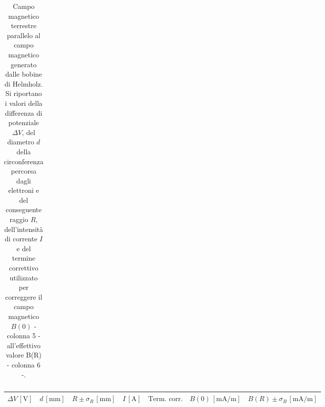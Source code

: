 \documentclass[]{article}
\begin{document}
\begin{table}
\begin{tabular}{||c|c|c|c|c|c|c||}
\end{tabular}
    \caption{Campo magnetico terrestre parallelo al campo magnetico generato dalle bobine di Helmholz. Si riportano i valori della differenza di potenziale $\Delta V$, del diametro $ d $ della circonferenza percorsa dagli elettroni e del conseguente raggio $ R $, dell'intensità di corrente $ I $ e del termine correttivo utilizzato per correggere il campo magnetico $B(0)$ - colonna 5 - all'effettivo valore B(R) - colonna 6 -.}
    \label{CM_parallelo}
\end{table}


\begin{table}
    \centering

\begin{tabular}{||c|c|c|c|c|c|c||}
    \hline
    $\Delta V\, [\text{V}] $ & $d\, [\text{mm}] $ & $R \pm \sigma_R\, [\text{mm}] $ & $I\, [\text{A}] $ & $\text{Term. corr.}$ & $B(0)\, [\text{mA/m}] $ & $B(R) \pm \sigma_B\, [\text{mA/m}] $ \\
    \hline\hline


\end{tabular}
\end{table}
\end{document}
